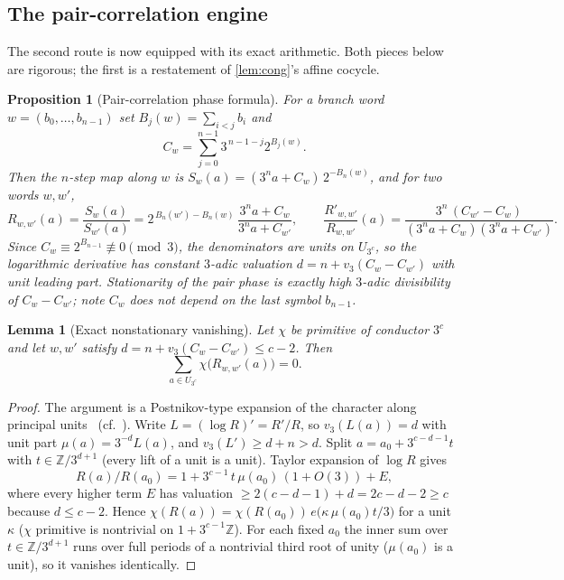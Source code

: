 \documentclass[11pt]{article}
\newcommand{\Z}{\mathbb{Z}}
\theoremstyle{plain}
\newtheorem{proposition}{Proposition}
\newtheorem{lemma}{Lemma}
\theoremstyle{definition}
\theoremstyle{remark}
\begin{document}
\subsection*{The pair-correlation engine}

The second route is now equipped with its exact arithmetic. Both pieces below
are rigorous; the first is a restatement of \cref{lem:cong}'s affine cocycle.

\begin{proposition}[Pair-correlation phase formula]\label{prop:paircorr}
For a branch word $w=(b_0,\dots,b_{n-1})$ set $B_j(w)=\sum_{i<j}b_i$ and
\[
C_w=\sum_{j=0}^{n-1}3^{\,n-1-j}2^{B_j(w)} .
\]
Then the $n$-step map along $w$ is
$S_w(a)=(3^na+C_w)\,2^{-B_n(w)}$, and for two words $w,w'$,
\[
R_{w,w'}(a)=\frac{S_w(a)}{S_{w'}(a)}
=2^{\,B_n(w')-B_n(w)}\,\frac{3^na+C_w}{3^na+C_{w'}},
\qquad
\frac{R'_{w,w'}}{R_{w,w'}}(a)
=\frac{3^n\,(C_{w'}-C_w)}{(3^na+C_w)(3^na+C_{w'})}.
\]
Since $C_w\equiv2^{B_{n-1}}\not\equiv0\pmod3$, the denominators are units on
$U_{3^c}$, so the logarithmic derivative has \emph{constant} $3$-adic valuation
$d=n+v_3(C_w-C_{w'})$ with unit leading part. Stationarity of the pair phase is
exactly high $3$-adic divisibility of $C_w-C_{w'}$; note $C_w$ does not depend
on the last symbol $b_{n-1}$.
\end{proposition}

\begin{lemma}[Exact nonstationary vanishing]\label{lem:vanish}
Let $\chi$ be primitive of conductor $3^c$ and let $w,w'$ satisfy
$d=n+v_3(C_w-C_{w'})\le c-2$. Then
\[
\sum_{a\in U_{3^c}}\chi\bigl(R_{w,w'}(a)\bigr)=0 .
\]
\end{lemma}
\begin{proof}
The argument is a Postnikov-type expansion of the character along principal
units~\cite{postnikov1955} (cf.\ \cite[\S12.3]{iwanieckowalski}).
Write $L=(\log R)'=R'/R$, so $v_3(L(a))=d$ with unit part
$\mu(a)=3^{-d}L(a)$, and $v_3(L')\ge d+n>d$. Split $a=a_0+3^{c-d-1}t$ with
$t\in\Z/3^{d+1}$ (every lift of a unit is a unit). Taylor expansion of
$\log R$ gives
\[
R(a)/R(a_0)=1+3^{c-1}\,t\,\mu(a_0)\,(1+O(3))+E,
\]
where every higher term $E$ has valuation
$\ge2(c-d-1)+d=2c-d-2\ge c$ because $d\le c-2$. Hence
$\chi(R(a))=\chi(R(a_0))\,e\bigl(\kappa\,\mu(a_0)t/3\bigr)$ for a unit
$\kappa$ ($\chi$ primitive is nontrivial on $1+3^{c-1}\Z$). For each fixed
$a_0$ the inner sum over $t\in\Z/3^{d+1}$ runs over full periods of a
nontrivial third root of unity ($\mu(a_0)$ is a unit), so it vanishes
identically.
\end{proof}
\end{document}
